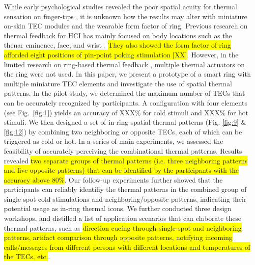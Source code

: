 \documentclass[preprint,12pt]{elsarticle}
\begin{document}
While early psychological studies revealed the poor spatial acuity for thermal sensation on finger-tips \cite{43}, it is unknown how the results may alter with miniature on-skin TEC modules and the wearable form factor of ring. Previous research on thermal feedback for HCI has mainly focused on body locations such as the thenar eminence, face, and wrist \cite{7,9,10,19,20,23,39}. \colorbox{yellow}{They also showed the form factor of ring afforded eight positions of pin-point poking stimulation [XX]}. However, in the limited research on ring-based thermal feedback \cite{24},  multiple thermal actuators on the ring were not used. In this paper, we present a prototype of a smart ring with multiple miniature TEC elements and investigate the use of spatial thermal patterns. In the pilot study, we determined the maximum number of TECs that can be accurately recognized by participants. A configuration with four elements (see Fig.~\ref{fig:1}) yields an accuracy of XXX\% for cold stimuli and XXX\% for hot stimuli. We then designed a set of in-ring spatial thermal patterns (Fig. \ref{fig:9} \& \ref{fig:12}) by combining two neighboring or opposite TECs, each of which can be triggered as cold or hot. In a series of main experiments, we assessed the feasibility of accurately perceiving the combinational thermal patterns. Results revealed \colorbox{yellow}{two separate groups of thermal patterns (i.e. three neighboring patterns and five opposite patterns) that can be identified by the participants with the accuracy above 80\%}. Our follow-up experiments further showed that the participants can reliably identifiy the thermal patterns in the combined group of single-spot cold stimulations and neighboring/opposite patterns, indicating their potential usage as in-ring thermal icons. We further conducted three design workshops, and distilled a list of application scenarios that can elaborate these thermal patterns, such as \colorbox{yellow}{direction cueing through single-spot and neighboring patterns, artifact comparison through opposite patterns, notifying incoming calls/messages from different persons with different locations and temperatures of the TECs, etc.}.

\end{document}
